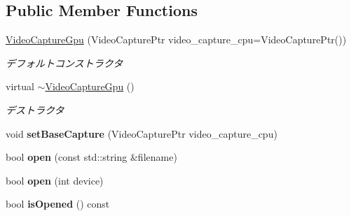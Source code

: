 \subsection*{Public Member Functions}
\begin{DoxyCompactItemize}
\item 
\hypertarget{classskl_1_1gpu_1_1_video_capture_gpu_ae1f7efcbf9ad654fbaec674d2c282c40}{}\label{classskl_1_1gpu_1_1_video_capture_gpu_ae1f7efcbf9ad654fbaec674d2c282c40} 
\hyperlink{classskl_1_1gpu_1_1_video_capture_gpu_ae1f7efcbf9ad654fbaec674d2c282c40}{Video\+Capture\+Gpu} (Video\+Capture\+Ptr video\+\_\+capture\+\_\+cpu=Video\+Capture\+Ptr())
\begin{DoxyCompactList}\small\item\em デフォルトコンストラクタ \end{DoxyCompactList}\item 
\hypertarget{classskl_1_1gpu_1_1_video_capture_gpu_a5e357372ee3f6717d8d407617178dc8c}{}\label{classskl_1_1gpu_1_1_video_capture_gpu_a5e357372ee3f6717d8d407617178dc8c} 
virtual \hyperlink{classskl_1_1gpu_1_1_video_capture_gpu_a5e357372ee3f6717d8d407617178dc8c}{$\sim$\+Video\+Capture\+Gpu} ()
\begin{DoxyCompactList}\small\item\em デストラクタ \end{DoxyCompactList}\item 
\hypertarget{classskl_1_1gpu_1_1_video_capture_gpu_a5db6d5866b7be0673457872cfe9c8714}{}\label{classskl_1_1gpu_1_1_video_capture_gpu_a5db6d5866b7be0673457872cfe9c8714} 
void {\bfseries set\+Base\+Capture} (Video\+Capture\+Ptr video\+\_\+capture\+\_\+cpu)
\item 
\hypertarget{classskl_1_1gpu_1_1_video_capture_gpu_a9de0b1d144534e21d5a0c169966a2765}{}\label{classskl_1_1gpu_1_1_video_capture_gpu_a9de0b1d144534e21d5a0c169966a2765} 
bool {\bfseries open} (const std\+::string \&filename)
\item 
\hypertarget{classskl_1_1gpu_1_1_video_capture_gpu_a1d45dcb80d7ac64f30ac02fb3ee44af6}{}\label{classskl_1_1gpu_1_1_video_capture_gpu_a1d45dcb80d7ac64f30ac02fb3ee44af6} 
bool {\bfseries open} (int device)
\item 
\hypertarget{classskl_1_1gpu_1_1_video_capture_gpu_a1253eef48a2b45e7ca355c82c7cf3ff0}{}\label{classskl_1_1gpu_1_1_video_capture_gpu_a1253eef48a2b45e7ca355c82c7cf3ff0} 
bool {\bfseries is\+Opened} () const
\item 
\hypertarget{classskl_1_1gpu_1_1_video_capture_gpu_ad9ccd9142fac1bfd4564df8ef660b8a8}{}\label{classskl_1_1gpu_1_1_video_capture_gpu_ad9ccd9142fac1bfd4564df8ef660b8a8} 

\end{DoxyCompactItemize}

